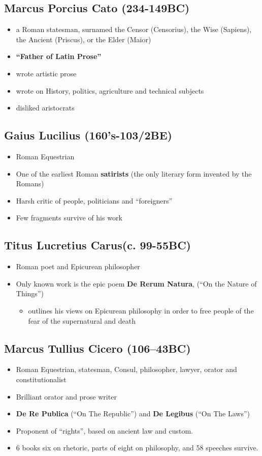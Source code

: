 \documentclass[12pt, twoside]{article}
\begin{document}
\subsection{Marcus Porcius Cato (234-149BC)}
\begin{itemize}
\item a Roman statesman, surnamed the Censor (Censorius), the Wise (Sapiens), the Ancient (Priscus), or the Elder (Maior)
\item \textbf{“Father of Latin Prose”}
\item wrote artistic prose
\item wrote on History, politics, agriculture and technical subjects
\item disliked aristocrats
\end{itemize}

\subsection{Gaius Lucilius (160’s-103/2BE)}
\begin{itemize}
\item Roman Equestrian
\item One of the earliest Roman \textbf{satirists} (the only literary form invented by the Romans)
\item Harsh critic of people, politicians and “foreigners”
\item Few fragments survive of his work
\end{itemize}

\subsection{Titus Lucretius Carus(c. 99-55BC)}
\begin{itemize}
\item Roman poet and Epicurean philosopher
\item Only known work is the epic poem \textbf{De Rerum Natura}, (“On the Nature of Things”)
	\begin{itemize}
	\item outlines his views on Epicurean philosophy in order to free people of the fear of the supernatural and death
	\end{itemize}
\end{itemize}

\subsection{Marcus Tullius Cicero (106–43BC)}
\begin{itemize}
\item Roman Equestrian, statesman,  Consul, philosopher, lawyer, orator and constitutionalist
\item Brilliant orator and prose writer
\item \textbf{De Re Publica} (“On The Republic”) and \textbf{De Legibus} (“On The Laws”)
\item Proponent of  “rights”, based on ancient law and custom. 
\item 6 books six on rhetoric, parts of eight on philosophy, and 58 speeches survive.
\end{itemize}
\end{document}
